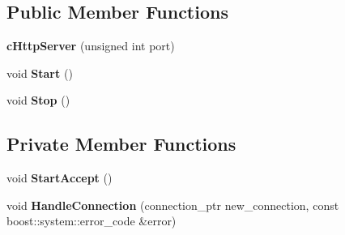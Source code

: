 \subsection*{\-Public \-Member \-Functions}
\begin{DoxyCompactItemize}
\item 
\hypertarget{classhttp__server_1_1cHttpServer_a26d917897dda50502ea1469fb5af9c2e}{
{\bfseries c\-Http\-Server} (unsigned int port)}
\label{classhttp__server_1_1cHttpServer_a26d917897dda50502ea1469fb5af9c2e}

\item 
\hypertarget{classhttp__server_1_1cHttpServer_ad4699b20627615aee961a06eae97fb89}{
void {\bfseries \-Start} ()}
\label{classhttp__server_1_1cHttpServer_ad4699b20627615aee961a06eae97fb89}

\item 
\hypertarget{classhttp__server_1_1cHttpServer_a2c7bcb8fb8ca1aa5fe26d00c94c11835}{
void {\bfseries \-Stop} ()}
\label{classhttp__server_1_1cHttpServer_a2c7bcb8fb8ca1aa5fe26d00c94c11835}

\end{DoxyCompactItemize}
\subsection*{\-Private \-Member \-Functions}
\begin{DoxyCompactItemize}
\item 
\hypertarget{classhttp__server_1_1cHttpServer_abec1513422a3b70b8c3684f4dc8c6271}{
void {\bfseries \-Start\-Accept} ()}
\label{classhttp__server_1_1cHttpServer_abec1513422a3b70b8c3684f4dc8c6271}

\item 
\hypertarget{classhttp__server_1_1cHttpServer_adfe4c5b575c0e94174a64d228f152d46}{
void {\bfseries \-Handle\-Connection} (connection\-\_\-ptr new\-\_\-connection, const boost\-::system\-::error\-\_\-code \&error)}
\label{classhttp__server_1_1cHttpServer_adfe4c5b575c0e94174a64d228f152d46}

\end{DoxyCompactItemize}
